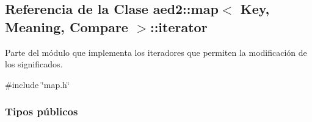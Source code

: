 \hypertarget{classaed2_1_1map_1_1iterator}{}\subsection{Referencia de la Clase aed2\+:\+:map$<$ Key, Meaning, Compare $>$\+:\+:iterator}
\label{classaed2_1_1map_1_1iterator}


Parte del módulo que implementa los iteradores que permiten la modificación de los significados.  




{\ttfamily \#include \char`\"{}map.\+h\char`\"{}}

\subsubsection*{Tipos públicos}
